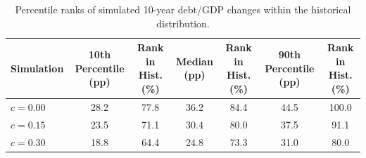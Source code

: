 \begin{table}
\caption{Percentile ranks of simulated 10-year debt/GDP changes within the historical distribution.}
\label{tab:sim_vs_hist_percentile_ranks}
\begin{tabular}{lcccccc}
\toprule
Simulation & 10th Percentile (pp) & Rank in Hist. (\%) & Median (pp) & Rank in Hist. (\%) & 90th Percentile (pp) & Rank in Hist. (\%) \\
\midrule
$c=0.00$ & 28.2 & 77.8 & 36.2 & 84.4 & 44.5 & 100.0 \\
$c=0.15$ & 23.5 & 71.1 & 30.4 & 80.0 & 37.5 & 91.1 \\
$c=0.30$ & 18.8 & 64.4 & 24.8 & 73.3 & 31.0 & 80.0 \\
\bottomrule
\end{tabular}
\end{table}
